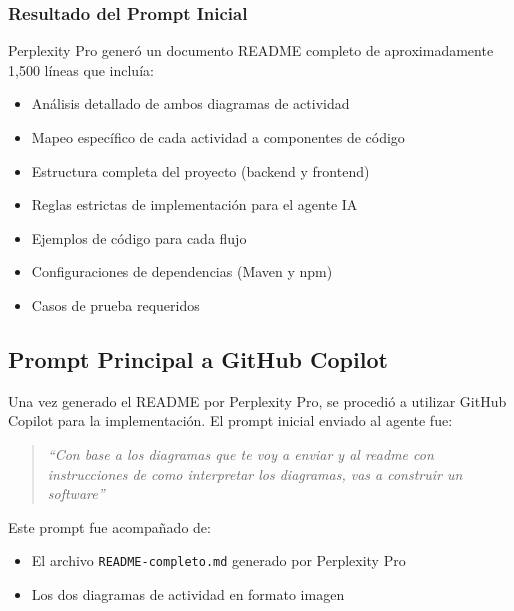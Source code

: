 \documentclass[11pt,a4paper]{article}
\begin{document}
\subsubsection{Resultado del Prompt Inicial}

Perplexity Pro generó un documento README completo de aproximadamente 1,500 líneas que incluía:

\begin{itemize}
    \item Análisis detallado de ambos diagramas de actividad
    \item Mapeo específico de cada actividad a componentes de código
    \item Estructura completa del proyecto (backend y frontend)
    \item Reglas estrictas de implementación para el agente IA
    \item Ejemplos de código para cada flujo
    \item Configuraciones de dependencias (Maven y npm)
    \item Casos de prueba requeridos
\end{itemize}

\subsection{Prompt Principal a GitHub Copilot}

Una vez generado el README por Perplexity Pro, se procedió a utilizar GitHub Copilot para la implementación. El prompt inicial enviado al agente fue:

\begin{quote}
\textit{``Con base a los diagramas que te voy a enviar y al readme con instrucciones de como interpretar los diagramas, vas a construir un software''}
\end{quote}

Este prompt fue acompañado de:
\begin{itemize}
    \item El archivo \texttt{README-completo.md} generado por Perplexity Pro
    \item Los dos diagramas de actividad en formato imagen
\end{itemize}

\end{document}
